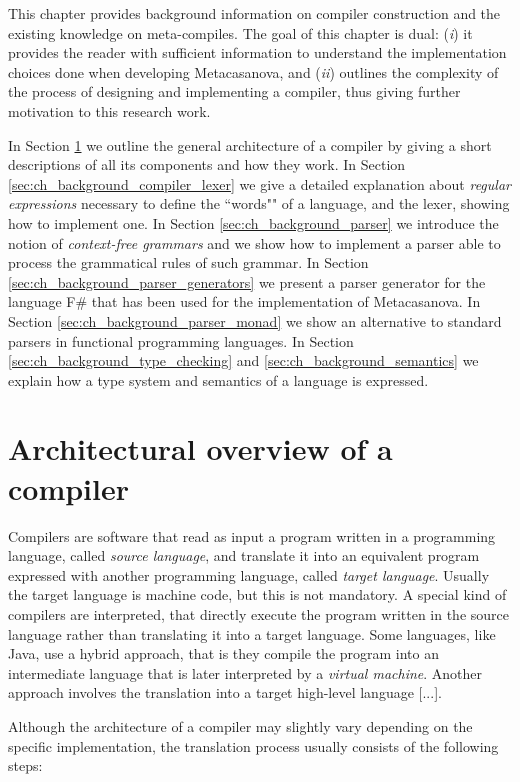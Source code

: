 This chapter provides background information on compiler construction and the existing knowledge on meta-compiles. The goal of this chapter is dual: (\textit{i}) it provides the reader with sufficient information to understand the implementation choices done when developing Metacasanova, and (\textit{ii}) outlines the complexity of the process of designing and implementing a compiler, thus giving further motivation to this research work.

In Section \ref{sec:ch_background_compiler_architecture} we outline the general architecture of a compiler by giving a short descriptions of all its components and how they work. In Section \ref{sec:ch_background_compiler_lexer} we give a detailed explanation about \textit{regular expressions} necessary to define the ``words"" of a language, and the lexer, showing how to implement one. In Section \ref{sec:ch_background_parser} we introduce the notion of \textit{context-free grammars} and we show how to implement a parser able to process the grammatical rules of such grammar. In Section \ref{sec:ch_background_parser_generators} we present a parser generator for the language F\# that has been used for the implementation of Metacasanova. In Section \ref{sec:ch_background_parser_monad} we show an alternative to standard parsers in functional programming languages. In Section \ref{sec:ch_background_type_checking} and \ref{sec:ch_background_semantics} we explain how a type system and semantics of a language is expressed.

\section{Architectural overview of a compiler}
\label{sec:ch_background_compiler_architecture}
Compilers are software that read as input a program written in a programming language, called \textit{source language}, and translate it into an equivalent program expressed with another programming language, called \textit{target language}. Usually the target language is machine code, but this is not mandatory. A special kind of compilers are interpreted, that directly execute the program written in the source language rather than translating it into a target language. Some languages, like Java, use a hybrid approach, that is they compile the program into an intermediate language that is later interpreted by a \textit{virtual machine}. Another approach involves the translation into a target high-level language [...].

Although the architecture of a compiler may slightly vary depending on the specific implementation, the translation process usually consists of the following steps:

